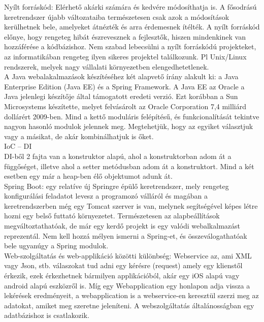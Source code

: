 \documentclass[11pt]{article}
\begin{document}
Nyílt forráskód: Elérhető akárki számára és kedvére módosíthatja is. A fősodrású keretrendszer újabb változataiba természetesen csak azok a módosítások kerülhetnek bele, amelyeket átnézték és arra érdemesnek ítélték. A nyílt forráskód előnye, hogy rengeteg hibát észrevesznek a fejlesztők, hiszen mindenkinek van hozzáférése a kódbázishoz. Nem szabad lebecsülni a nyílt forráskódú projekteket, az informatikában rengeteg ilyen sikeres projektel találkozunk. Pl Unix/Linux rendszerek, melyek nagy vállalati környezetben elengedhetetlenek.\\

A Java webalakalmazások készítéséhez két alapvető írány alakult ki: a Java Enterprise Edition (Java EE) és a Spring Framework. A Java EE az Oracle a Java jelenlegi készítője által támogatott eredeti verzió. Ezt korábban a Sun Microsystems készítette, melyet felvásárolt az Oracle Corporation 7,4 milliárd dollárért 2009-ben. Mind a kettő moduláris felépítésű, és funkcionalítását tekintve nagyon hasonló modulok jelennek meg. Megtehetjük, hogy az egyiket választjuk vagy a másikat, de akár kombinálhatjuk is őket.\\

IoC – DI\\

DI-ből 2 fajta van a konstruktor alapú, ahol a konstruktorban adom át a függőséget, illetve ahol a setter metódusban adom át a konstruktort. Mind a két esetben egy már a heap-ben élő objektumot adunk át.\\

Spring Boot: egy relatíve új Springre épülő keretrendszer, mely rengeteg konfigurálási feladatot levesz a programozó válláról és magában a keretrendszerben még egy Tomcat szerver is van, melynek segítségével képes létre hozni egy belső futtató környezetet. Természetesen az alapbeállítások megváltoztathatóak, de már egy kerdő projekt is egy valódi webalkalmazást reprezentál. Nem kell hozzá mélyen ismerni a Spring-et, és összeválogathatóak bele ugyanúgy a Spring modulok. \\

Web-szolgáltatás és web-applikáció közötti különbség: Webservice az, ami XML vagy Json, stb. válaszokat tud adni egy kérésre (request) amely egy klienstől érkezik, ezek érkezhetnek bármilyen applikációból, akár egy iOS alapú vagy android alapú eszközről is. Míg egy Webapplication egy honlapon adja vissza a lekérések eredményeit, a webapplication is a webservice-en keresztül szerzi meg az adatokat, amiket meg szeretne jeleníteni. A webszolgáltatás általánosságban egy adatbázishoz is csatlakozik.\\
\end{document}
